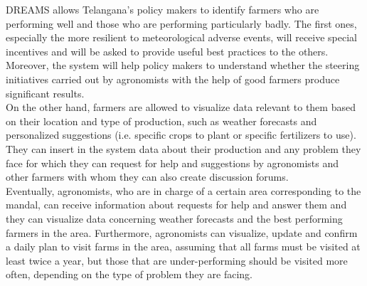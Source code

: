 DREAMS allows Telangana’s policy makers to  identify farmers who are performing well and those who are performing particularly badly. The first ones, especially the more resilient to meteorological adverse events, will receive special incentives and will be asked to provide useful best practices to the others. Moreover, the system will help policy makers to understand whether the steering initiatives carried out by agronomists with the help of good farmers produce significant results.\\

On the other hand, farmers are allowed to visualize data relevant to them based on their location and type of production, such as weather forecasts and personalized suggestions (i.e. specific crops to plant or specific fertilizers to use). They can insert in the system data about their production and any problem they face for which they can request for help and suggestions by agronomists and other farmers with whom they can also create discussion forums.\\

Eventually, agronomists, who are in charge of a certain area corresponding to the mandal, can receive information about requests for help and answer them and they can visualize data concerning weather forecasts and the best performing farmers in the area. Furthermore, agronomists can visualize, update and confirm a daily plan to visit farms in the area, assuming that all farms must be visited at least twice a year, but those that are under-performing should be visited more often, depending on the type of problem they are facing.

